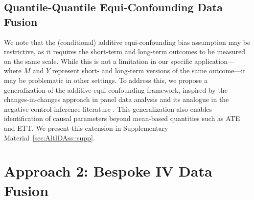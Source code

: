 \documentclass[10pt]{article}
\begin{document}
\subsection{Quantile-Quantile Equi-Confounding Data Fusion}
\label{sec:QQCondEqui}

We note that the (conditional) additive equi-confounding bias assumption may be restrictive, as it requires the short-term and long-term outcomes to be measured on the same scale. While this is not a limitation in our specific application---where \( M \) and \( Y \) represent short- and long-term versions of the same outcome---it may be problematic in other settings. To address this, we propose a generalization of the additive equi-confounding framework, inspired by the changes-in-changes approach in panel data analysis \citep{athey2006identification} and its analogue in the negative control inference literature \citep{sofer2016negative}. This generalization also enables identification of causal parameters beyond mean-based quantities such as ATE and ETT. We present this extension in Supplementary Material~\ref{sec:AltIDAss::supp}.


\section{Approach 2: Bespoke IV Data Fusion}
\label{sec:bsiv}
\end{document}
